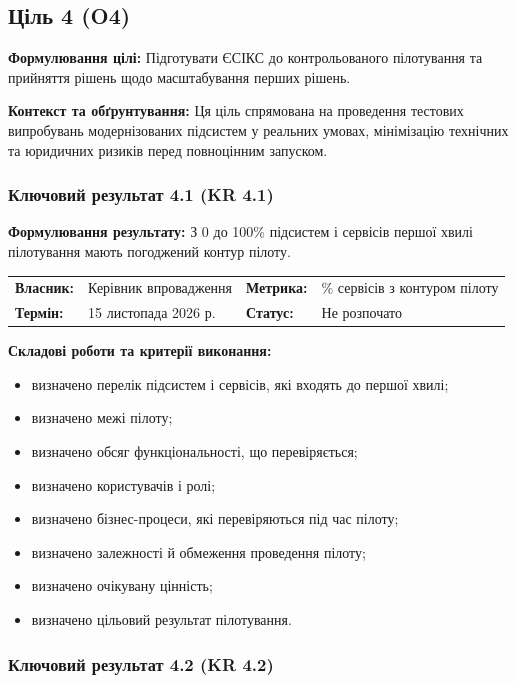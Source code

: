 \documentclass{article}
\begin{document}
\newpage

\subsection{Ціль 4 (O4)}

\textbf{Формулювання цілі:} Підготувати ЄСІКС до контрольованого пілотування та прийняття рішень щодо масштабування перших рішень.

\textbf{Контекст та обґрунтування:}
Ця ціль спрямована на проведення тестових випробувань модернізованих підсистем у реальних умовах, мінімізацію технічних та юридичних ризиків перед повноцінним запуском.

\subsubsection{Ключовий результат 4.1 (KR 4.1)}

\textbf{Формулювання результату:} З 0 до 100\% підсистем і сервісів першої хвилі пілотування мають погоджений контур пілоту.

\noindent\begin{tabular}{@{}p{2.2cm}p{4.5cm}p{2.2cm}p{4.5cm}@{}}
\toprule
\textbf{Власник:} & Керівник впровадження & \textbf{Метрика:} & \% сервісів з контуром пілоту \\
\textbf{Термін:} & 15 листопада 2026 р. & \textbf{Статус:} & Не розпочато \\
\bottomrule
\end{tabular}

\vspace{10pt}
\textbf{Складові роботи та критерії виконання:}
\begin{itemize}
    \item визначено перелік підсистем і сервісів, які входять до першої хвилі;
    \item визначено межі пілоту;
    \item визначено обсяг функціональності, що перевіряється;
    \item визначено користувачів і ролі;
    \item визначено бізнес-процеси, які перевіряються під час пілоту;
    \item визначено залежності й обмеження проведення пілоту;
    \item визначено очікувану цінність;
    \item визначено цільовий результат пілотування.
\end{itemize}

\subsubsection{Ключовий результат 4.2 (KR 4.2)}
\end{document}

